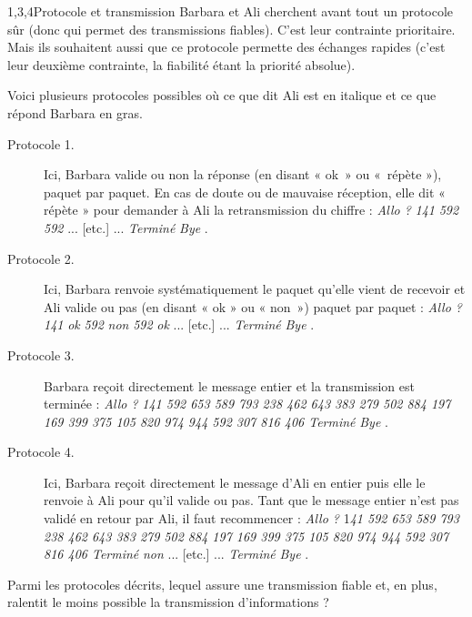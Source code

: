 \begin{quiz}[title={Internet}]
\begin{quizquestion*}[b]{2}{1,3,4}{Protocole et transmission}
Barbara et Ali cherchent avant tout un protocole sûr (donc qui permet des transmissions fiables). C’est leur contrainte prioritaire. Mais ils souhaitent aussi que ce protocole permette des échanges rapides (c’est leur deuxième contrainte, la fiabilité étant la priorité absolue).

Voici plusieurs protocoles possibles où ce que dit Ali est en italique et ce que répond Barbara en gras.
\begin{description}
\item[Protocole 1.] Ici, Barbara valide ou non la réponse (en disant « ok~» ou  «~répète »), paquet par paquet. En cas de doute ou de mauvaise réception, elle dit  « répète » pour demander à Ali la retransmission du chiffre :
\textit{Allo ?}  \textit{141}  \textit{592}  \textit{592}  ... [etc.] ... \textit{Terminé}  \textit{Bye} .
\item[Protocole 2.] Ici, Barbara renvoie systématiquement le paquet qu’elle vient de recevoir et Ali valide ou pas (en disant « ok » ou « non~») paquet par paquet : \textit{Allo ?}  \textit{141}  \textit{ok} \textit{592}  \textit{non} \textit{592}  \textit{ok} ... [etc.] ... \textit{Terminé}  \textit{Bye} .
\item[Protocole 3.] Barbara reçoit directement le message entier et la transmission est terminée : \textit{Allo ?}  \textit{141 592 653 589 793 238 462 643 383 279 502 884 197 169 399 375 105 820 974 944 592 307 816 406 Terminé}  \textit{Bye} .
\item[Protocole 4.] Ici, Barbara reçoit directement le message d’Ali en entier puis elle le renvoie à Ali pour qu’il valide ou pas. Tant que le message entier n’est pas validé en retour par Ali, il faut recommencer : \textit{Allo ?}  1\textit{41 592 653 589 793 238 462 643 383 279 502 884 197 169 399 375 105 820 974 944 592 307 816 406 Terminé}  \textit{non} ... [etc.] ... \textit{Terminé}  \textit{Bye} .
\end{description}

Parmi les protocoles décrits, lequel assure une transmission fiable et, en plus, ralentit le moins possible la transmission d'informations ? 
\end{quizquestion*}
\end{quiz}

